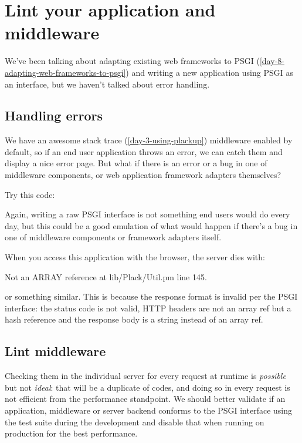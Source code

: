 \chapter{Lint your application and middleware}
\label{day-21-lint-your-application-and-middleware}

We've been talking about adapting existing web frameworks to PSGI
(\autoref{day-8-adapting-web-frameworks-to-psgi})
and writing a new application using
PSGI as an interface, but we haven't talked about error handling.

\section{Handling errors}\label{handling-errors}

We have an awesome stack trace (\autoref{day-3-using-plackup})
middleware enabled by default, so if an end user
application throws an error, we can catch them and display a nice error
page. But what if there is an error or a bug in one of middleware
components, or web application framework adapters themselves?

Try this code:


Again, writing a raw PSGI interface is not something end users would do
every day, but this could be a good emulation of what would happen if
there's a bug in one of middleware components or framework adapters
itself.

When you access this application with the browser, the server dies with:

\begin{shell}
Not an ARRAY reference at lib/Plack/Util.pm line 145.
\end{shell}
%
or something similar. This is because the response format is invalid per
the PSGI interface: the status code is not valid, HTTP headers are not an
array ref but a hash reference and the response body is a string instead
of an array ref.

\section{Lint middleware}\label{lint-middleware}

Checking them in the individual server for every request at runtime
is \emph{possible} but not \emph{ideal}: that will be a duplicate of
codes, and doing so in every request is not efficient from the
performance standpoint. We should better validate if an application,
middleware or server backend conforms to the PSGI interface using the
test suite during the development and disable that when running on
production for the best performance.

